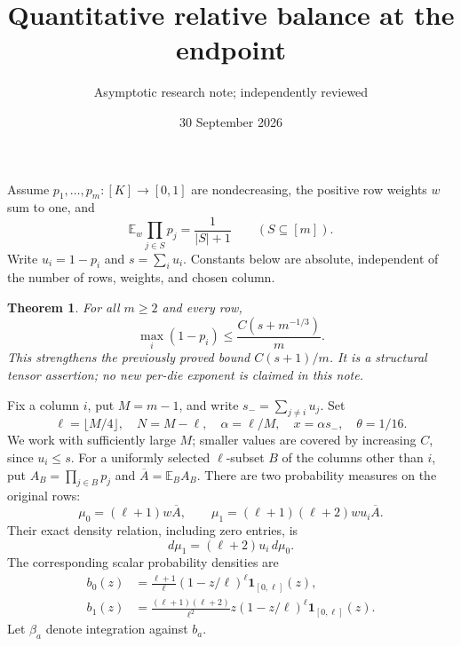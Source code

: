 \documentclass[11pt]{article}
\title{Quantitative relative balance at the endpoint}
\author{Asymptotic research note; independently reviewed}
\date{30 September 2026}
\newtheorem{theorem}{Theorem}
\newcommand{\E}{\mathbb E}
\begin{document}
\maketitle
Assume $p_1,\ldots,p_m:[K]\to[0,1]$ are nondecreasing, the positive
row weights $w$ sum to one, and
\[
 \E_w\prod_{j\in S}p_j=\frac1{|S|+1}\qquad(S\subseteq[m]).
\]
Write $u_i=1-p_i$ and $s=\sum_i u_i$. Constants below are absolute,
independent of the number of rows, weights, and chosen column.

\begin{theorem}\label{main}
For all $m\ge2$ and every row,
\[
 \max_i(1-p_i)\le\frac{C(s+m^{-1/3})}{m}.           \tag{1}
\]
This strengthens the previously proved bound $C(s+1)/m$.
It is a structural tensor assertion; no new per-die exponent is
claimed in this note.
\end{theorem}

Fix a column $i$, put $M=m-1$, and write
$s_-=\sum_{j\ne i}u_j$. Set
\[
 \ell=\lfloor M/4\rfloor,\quad N=M-\ell,\quad
 \alpha=\ell/M,\quad x=\alpha s_-,\quad\theta=1/16.
\]
We work with sufficiently large $M$; smaller values are covered by
increasing $C$, since $u_i\le s$.
For a uniformly selected $\ell$-subset $B$ of the columns other than
$i$, put $A_B=\prod_{j\in B}p_j$ and $\overline A=\E_B A_B$.
There are two probability measures on the original rows:
\[
 \mu_0=(\ell+1)w\overline A,\qquad
 \mu_1=(\ell+1)(\ell+2)w u_i\overline A.
 \tag{2}
\]
Their exact density relation, including zero entries, is
\[
 d\mu_1=(\ell+2)u_i\,d\mu_0.                       \tag{3}
\]
The corresponding scalar probability densities are
\begin{align*}
 b_0(z)&=\frac{\ell+1}{\ell}(1-z/\ell)^\ell
                     \boldsymbol1_{[0,\ell]}(z),\\
 b_1(z)&=\frac{(\ell+1)(\ell+2)}{\ell^2}
                   z(1-z/\ell)^\ell\boldsymbol1_{[0,\ell]}(z).
\end{align*}
Let $\beta_a$ denote integration against $b_a$.
\end{document}
